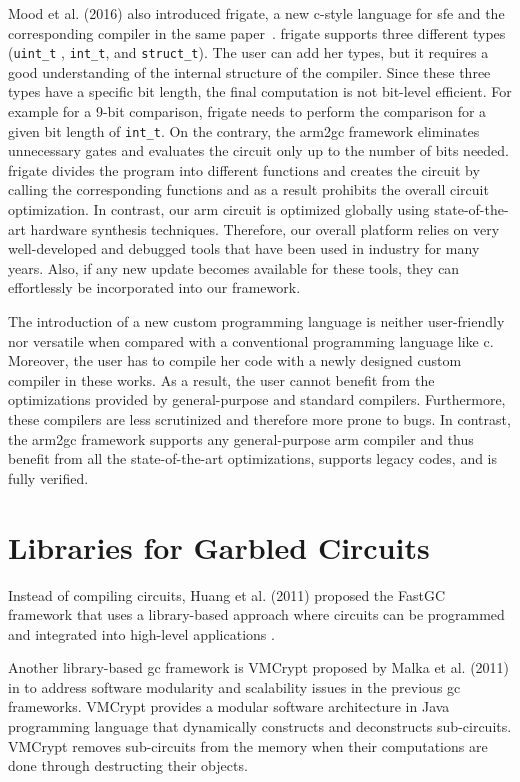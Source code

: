 Mood et al. (2016) also introduced \gls{frigate}, a new \gls{c}-style language for \acrshort{sfe} and the corresponding compiler in the same paper~\cite{mood2016frigate}.
\gls{frigate} supports three different types (\texttt{uint\_t} , \texttt{int\_t}, and \texttt{struct\_t}).
The user can add her types, but it requires a good understanding of the internal structure of the compiler.
Since these three types have a specific bit length, the final computation is not bit-level efficient.
For example for a 9-bit comparison, \gls{frigate} needs to perform the comparison for a given bit length of \texttt{int\_t}.
On the contrary, the \gls{arm2gc} framework eliminates unnecessary gates and evaluates the circuit only up to the number of bits needed.
\gls{frigate} divides the program into different functions and creates the circuit by calling the corresponding functions and as a result prohibits the overall circuit optimization.
In contrast, our \gls{arm} circuit is optimized globally using state-of-the-art hardware synthesis techniques.
Therefore, our overall platform relies on very well-developed and debugged tools that have been used in industry for many years.
Also, if any new update becomes available for these tools, they can effortlessly be incorporated into our framework.

The introduction of a new custom programming language is neither user-friendly nor versatile when compared with a conventional programming language like \gls{c}.
Moreover, the user has to compile her code with a newly designed custom compiler in these works.
As a result, the user cannot benefit from the optimizations provided by general-purpose and standard compilers.
Furthermore, these compilers are less scrutinized and therefore more prone to bugs.
In contrast, the \gls{arm2gc} framework supports any general-purpose \gls{arm} compiler and thus benefit from all the state-of-the-art optimizations, supports legacy codes, and is fully verified.

\section{Libraries for Garbled Circuits}\label{sec:related-library}
Instead of compiling circuits, Huang et al. (2011) proposed the FastGC framework that uses a library-based approach where circuits can be programmed and integrated into high-level applications \cite{huang2011faster}.

Another library-based \acrshort{gc} framework is VMCrypt proposed by Malka et al. (2011) in \cite{malka2011vmcrypt} to address software modularity and scalability issues in the previous \acrshort{gc} frameworks.
VMCrypt provides a modular software architecture in Java programming language that dynamically constructs and deconstructs sub-circuits.
VMCrypt removes sub-circuits from the memory when their computations are done through destructing their objects.


